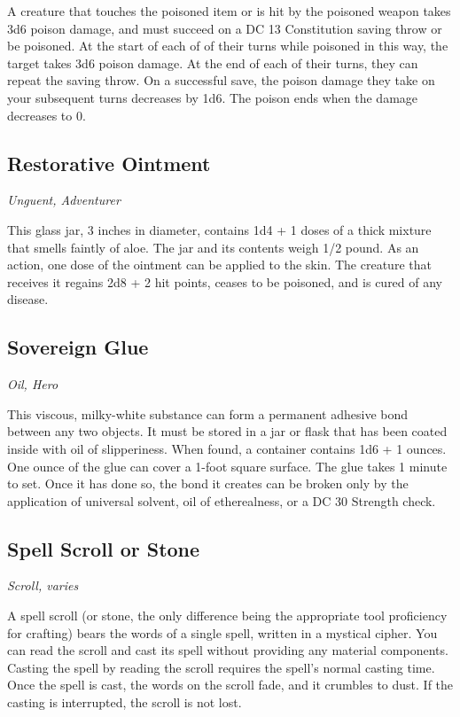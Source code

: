 A creature that touches the poisoned item or is hit by the poisoned weapon takes 3d6 poison damage, and must succeed on a DC 13 Constitution saving throw or be poisoned. At the start of each of of their turns while poisoned in this way, the target takes 3d6 poison damage. At the end of each of their turns, they can repeat the saving throw. On a successful save, the poison damage they take on your subsequent turns decreases by 1d6. The poison ends when the damage decreases to 0.

\subsection{Restorative Ointment}
\textit{Unguent, Adventurer}

This glass jar, 3 inches in diameter, contains 1d4 + 1 doses of a thick mixture that smells faintly of aloe. The jar and its contents weigh 1/2 pound. As an action, one dose of the ointment can be applied to the skin. The creature that receives it regains 2d8 + 2 hit points, ceases to be poisoned, and is cured of any disease.

\subsection{Sovereign Glue}
\textit{Oil, Hero}

This viscous, milky-white substance can form a permanent adhesive bond between any two objects. It must be stored in a jar or flask that has been coated inside with oil of slipperiness. When found, a container contains 1d6 + 1 ounces.  One ounce of the glue can cover a 1-foot square surface. The glue takes 1 minute to set. Once it has done so, the bond it creates can be broken only by the application of universal solvent, oil of etherealness, or a DC 30 Strength check.

\subsection{Spell Scroll or Stone}
\textit{Scroll, varies} 

A spell scroll (or stone, the only difference being the appropriate tool proficiency for crafting) bears the words of a single spell, written in a mystical cipher. You can read the scroll and cast its spell without providing any material components. Casting the spell by reading the scroll requires the spell's normal casting time. Once the spell is cast, the words on the scroll fade, and it crumbles to dust. If the casting is interrupted, the scroll is not lost.

